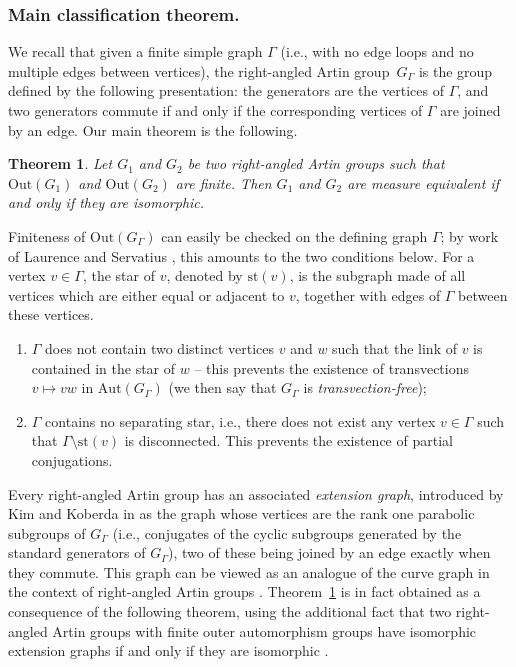 \documentclass[11pt]{article}
\newcommand{\ie}{i.e.,\xspace}
\numberwithin{equation}{section}
\theoremstyle{plain}
\newtheorem{theointro}{Theorem}
\theoremstyle{definition}
\newcommand{\Aut}{\mathrm{Aut}}
\newcommand{\Out}{\mathrm{Out}}
\newcommand{\st}{\mathrm{st}}
\begin{document}
\subsubsection*{Main classification theorem.} We recall that given a finite simple graph $\Gamma$ (\ie with no edge loops and no multiple edges between vertices), the right-angled Artin group~$G_\Gamma$ is the group defined by the following presentation: the generators are the vertices of $\Gamma$, and two generators commute if and only if the corresponding vertices of $\Gamma$ are joined by an edge. Our main theorem is the following.

\begin{theointro}\label{theointro:1}
Let $G_1$ and $G_2$ be two right-angled Artin groups such that $\Out(G_1)$ and $\Out(G_2)$ are finite. Then $G_1$ and $G_2$ are measure equivalent if and only if they are isomorphic.
\end{theointro}

Finiteness of $\Out(G_\Gamma)$ can easily be checked on the defining graph $\Gamma$; by work of Laurence \cite{laurence1995generating} and Servatius \cite{Ser}, this amounts to the two conditions below. For a vertex $v\in\Gamma$, the star of $v$, denoted by $\st(v)$, is the subgraph made of all vertices which are either equal or adjacent to $v$, together with edges of $\Gamma$ between these vertices.
\begin{enumerate}
\item $\Gamma$ does not contain two distinct vertices $v$ and $w$ such that the link of $v$ is contained in the star of $w$ -- this prevents the existence of transvections $v\mapsto vw$ in $\Aut(G_\Gamma)$ (we then say that $G_\Gamma$ is \emph{transvection-free});
\item $\Gamma$ contains no separating star, \ie there does not exist any vertex $v\in\Gamma$ such that $\Gamma\setminus \st(v)$ is disconnected. This prevents the existence of partial conjugations.
\end{enumerate}

Every right-angled Artin group has an associated \emph{extension graph}, introduced by Kim and Koberda in \cite{kim2013embedability} as the graph whose vertices are the rank one parabolic subgroups of $G_\Gamma$ (\ie conjugates of the cyclic subgroups generated by the standard generators of $G_\Gamma$), two of these being joined by an edge exactly when they commute. This graph can be viewed as an analogue of the curve graph in the context of right-angled Artin groups \cite{kim2014geometry}. Theorem~\ref{theointro:1} is in fact obtained as a consequence of the following theorem, using the additional fact that two right-angled Artin groups with finite outer automorphism groups have isomorphic extension graphs if and only if they are isomorphic \cite{Hua}.
\end{document}
